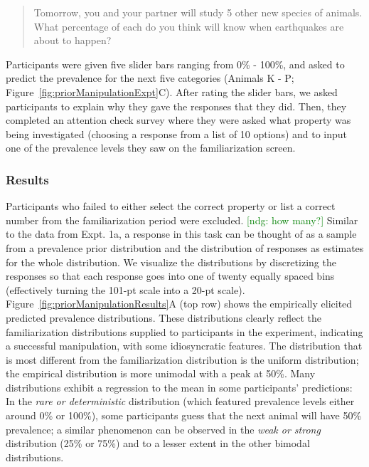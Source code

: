 \documentclass[floatsintext,doc]{apa6}
\newcommand{\ndg}[1]{{\textcolor{Green}{[ndg: #1]}}}
\begin{document}
\begin{quote}
Tomorrow, you and your partner will study 5 other new species of animals. What percentage of each do you think will know when earthquakes are about to happen?
\end{quote}

Participants were given five slider bars ranging from 0\% - 100\%, and asked to predict the prevalence for the next five categories (Animals K - P; Figure~\ref{fig:priorManipulationExpt}C).
After rating the slider bars, we asked participants to explain why they gave the responses that they did.
Then, they completed an attention check survey where they were asked what property was being investigated (choosing a response from a list of 10 options) and to input one of the prevalence levels they saw on the familiarization screen.

\hypertarget{results-1}{%
\subsubsection{Results}\label{results-1}}

Participants who failed to either select the correct property or list a correct number from the familiarization period were excluded. \ndg{how many?}
Similar to the data from Expt. 1a, a response in this task can be thought of as a sample from a prevalence prior distribution and the distribution of responses as estimates for the whole distribution.
We visualize the distributions by discretizing the responses so that each response goes into one of twenty equally spaced bins (effectively turning the 101-pt scale into a 20-pt scale).
Figure~\ref{fig:priorManipulationResults}A (top row) shows the empirically elicited predicted prevalence distributions.
These distributions clearly reflect the familiarization distributions supplied to participants in the experiment, indicating a successful manipulation, with some idiosyncratic features.
The distribution that is most different from the familiarization distribution is the uniform distribution; the empirical distribution is more unimodal with a peak at 50\%.
Many distributions exhibit a regression to the mean in some participants' predictions: In the \emph{rare or deterministic} distribution (which featured prevalence levels either around 0\% or 100\%), some participants guess that the next animal will have 50\% prevalence; a similar phenomenon can be observed in the \emph{weak or strong} distribution (25\% or 75\%) and to a lesser extent in the other bimodal distributions.
\end{document}
